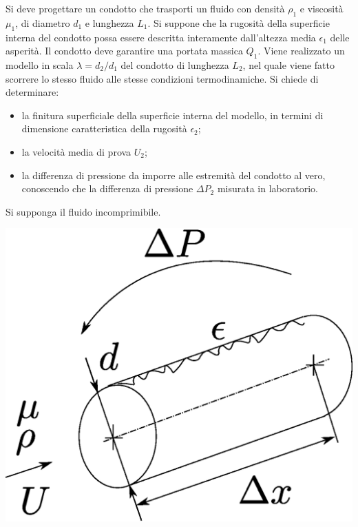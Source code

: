 \begin{minipage}[l]{0.5\textwidth}
  \begin{exerciseS}
  Si deve progettare un condotto che trasporti un fluido con densità
  $\rho_1$ e viscosità $\mu_1$, di diametro $d_1$ e lunghezza $L_1$.
  Si suppone che la rugosità della superficie interna del condotto possa
  essere descritta interamente dall'altezza media $\epsilon_1$
  delle asperità. Il condotto deve garantire una portata massica $Q_1$.
  Viene realizzato un modello in scala $\lambda = d_2 / d_1$ del condotto
  di lunghezza $L_2$, nel quale viene fatto scorrere lo stesso fluido 
  alle stesse condizioni termodinamiche. Si chiede di determinare:
  \begin{itemize}
   \item la finitura superficiale della superficie interna del modello,
         in termini di dimensione caratteristica della rugosità $\epsilon_2$;
   \item la velocità media di prova $U_2$;
   \item la differenza di pressione da imporre alle estremità del condotto
         al vero, conoscendo che la differenza di pressione $\Delta P_2$
         misurata in laboratorio.
  \end{itemize}
  Si supponga il fluido incomprimibile.
  \end{exerciseS}

\end{minipage}
\hspace{3mm}
\begin{minipage}[r]{0.5\textwidth}
 \centering
  \includegraphics[width=1.0\textwidth]{./fig/pipe}
\end{minipage}

